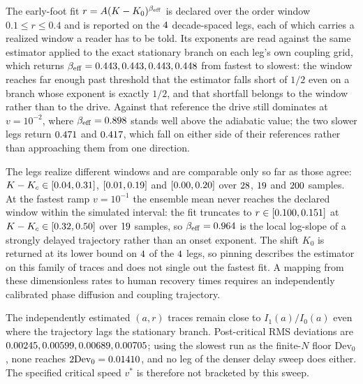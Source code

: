 \documentclass{article}
\begin{document}
The early-foot fit $r=A(K-K_0)^{\beta_{\rm eff}}$ is declared over the order window $0.1\leq r\leq0.4$ and is reported on the $4$ decade-spaced legs, each of which carries a realized window a reader has to be told. Its exponents are read against the same estimator applied to the exact stationary branch on each leg's own coupling grid, which returns $\beta_{\rm eff}=0.443,0.443,0.443,0.448$ from fastest to slowest: the window reaches far enough past threshold that the estimator falls short of $1/2$ even on a branch whose exponent is exactly $1/2$, and that shortfall belongs to the window rather than to the drive. Against that reference the drive still dominates at $v=10^{-2}$, where $\beta_{\rm eff}=0.898$ stands well above the adiabatic value; the two slower legs return $0.471$ and $0.417$, which fall on either side of their references rather than approaching them from one direction.

The legs realize different windows and are comparable only so far as those agree: $K-K_c\in[0.04,0.31]$, $[0.01,0.19]$ and $[0.00,0.20]$ over $28$, $19$ and $200$ samples. At the fastest ramp $v=10^{-1}$ the ensemble mean never reaches the declared window within the simulated interval: the fit truncates to $r\in[0.100,0.151]$ at $K-K_c\in[0.32,0.50]$ over $19$ samples, so $\beta_{\rm eff}=0.964$ is the local log-slope of a strongly delayed trajectory rather than an onset exponent. The shift $K_0$ is returned at its lower bound on $4$ of the $4$ legs, so pinning describes the estimator on this family of traces and does not single out the fastest fit.  A mapping from these dimensionless rates to human recovery times requires an independently calibrated phase diffusion and coupling trajectory.

The independently
estimated $(a,r)$ traces remain close to $I_1(a)/I_0(a)$ even where the
trajectory lags the stationary branch.  Post-critical RMS deviations are
$0.00245,0.00599,0.00689,0.00705$; using the slowest run as the finite-$N$
floor $\mathrm{Dev}_0$, none reaches $2\mathrm{Dev}_0=0.01410$, and no leg of the denser delay sweep does either.  The specified
critical speed $v^*$ is therefore not bracketed by this sweep.
\end{document}
